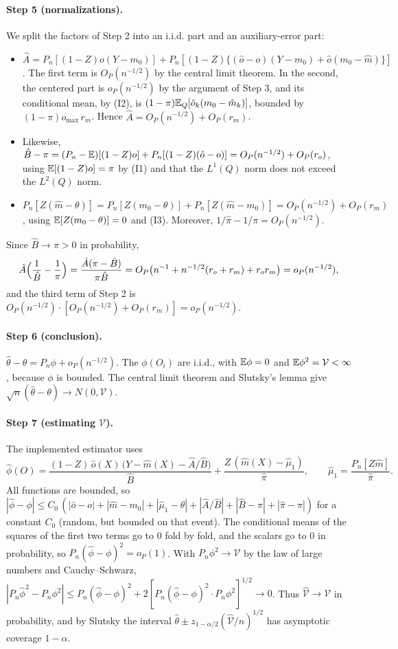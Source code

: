 \paragraph{Step 5 (normalizations).} We split the factors of Step 2 into an i.i.d. part and an auxiliary-error part:
\begin{itemize}
  \item $\hat A=P_n[(1-Z)o(Y-m_0)]+P_n[(1-Z)\{(\hat o-o)(Y-m_0)+\hat o(m_0-\hat m)\}]$. The first term is $O_P(n^{-1/2})$ by the central limit theorem. In the second, the centered part is $o_P(n^{-1/2})$ by the argument of Step 3, and its conditional mean, by (I2), is $(1-\pi)\mathbb{E}_Q[\hat o_k(m_0-\hat m_k)]$, bounded by $(1-\pi)o_{\max}\,r_m$. Hence $\hat A=O_P(n^{-1/2})+O_P(r_m)$.
  \item Likewise, $\hat B-\pi=(P_n-\mathbb{E})[(1-Z)o]+P_n[(1-Z)(\hat o-o)]=O_P(n^{-1/2})+O_P(r_o)$, using $\mathbb{E}[(1-Z)o]=\pi$ by (I1) and that the $L^1(Q)$ norm does not exceed the $L^2(Q)$ norm.
  \item $P_n[Z(\hat m-\theta)]=P_n[Z(m_0-\theta)]+P_n[Z(\hat m-m_0)]=O_P(n^{-1/2})+O_P(r_m)$, using $\mathbb{E}[Z(m_0-\theta)]=0$ and (I3). Moreover, $1/\hat\pi-1/\pi=O_P(n^{-1/2})$.
\end{itemize}
Since $\hat B\to\pi>0$ in probability,
\[
\hat A\Bigl(\frac1{\hat B}-\frac1\pi\Bigr)=\frac{\hat A(\pi-\hat B)}{\pi\hat B}=O_P\bigl(n^{-1}+n^{-1/2}(r_o+r_m)+r_or_m\bigr)=o_P(n^{-1/2}),
\]
and the third term of Step 2 is $O_P(n^{-1/2})\cdot[O_P(n^{-1/2})+O_P(r_m)]=o_P(n^{-1/2})$.

\paragraph{Step 6 (conclusion).} $\hat\theta-\theta=P_n\phi+o_P(n^{-1/2})$. The $\phi(O_i)$ are i.i.d., with $\mathbb{E}\phi=0$ and $\mathbb{E}\phi^2=\mathcal V<\infty$, because $\phi$ is bounded. The central limit theorem and Slutsky's lemma give $\sqrt n(\hat\theta-\theta)\to N(0,\mathcal V)$.

\paragraph{Step 7 (estimating $\mathcal V$).} The implemented estimator uses
\[
\hat\phi(O)=\frac{(1-Z)\,\hat o(X)\,\bigl(Y-\hat m(X)-\hat A/\hat B\bigr)}{\hat B}+\frac{Z\,(\hat m(X)-\hat\mu_1)}{\hat\pi},\qquad\hat\mu_1=\frac{P_n[Z\hat m]}{\hat\pi}.
\]
All functions are bounded, so $|\hat\phi-\phi|\le C_0\,(|\hat o-o|+|\hat m-m_0|+|\hat\mu_1-\theta|+|\hat A/\hat B|+|\hat B-\pi|+|\hat\pi-\pi|)$ for a constant $C_0$ (random, but bounded on that event). The conditional means of the squares of the first two terms go to 0 fold by fold, and the scalars go to 0 in probability, so $P_n(\hat\phi-\phi)^2=o_P(1)$. With $P_n\phi^2\to \mathcal V$ by the law of large numbers and Cauchy--Schwarz, $|P_n\hat\phi^2-P_n\phi^2|\le P_n(\hat\phi-\phi)^2+2[P_n(\hat\phi-\phi)^2\cdot P_n\phi^2]^{1/2}\to0$. Thus $\hat{\mathcal V}\to \mathcal V$ in probability, and by Slutsky the interval $\hat\theta\pm z_{1-\alpha/2}(\hat{\mathcal V}/n)^{1/2}$ has asymptotic coverage $1-\alpha$.

